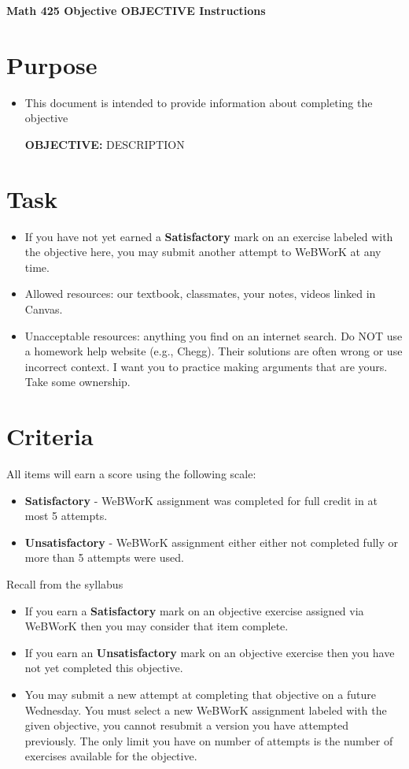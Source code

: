\documentclass[12pt]{article}
\begin{document}
	\begin{center}
		{\Large \bf Math 425 Objective OBJECTIVE Instructions}
	\end{center}
	\section*{Purpose}
	\begin{itemize}
		\item This document is intended to provide information about completing the objective
		
		\textbf{OBJECTIVE:} DESCRIPTION

	\end{itemize}
	\section*{Task}
	\begin{itemize}
		\item If you have not yet earned a \textbf{Satisfactory} mark on an exercise labeled with the objective here, you may submit another attempt to WeBWorK at any time.
		\item Allowed resources: our textbook, classmates, your notes, videos linked in Canvas.
		\item Unacceptable resources: anything you find on an internet search. Do NOT use a homework help website (e.g., Chegg). Their solutions are often wrong or use incorrect context.  I want you to practice making arguments that are yours. Take some ownership.
	\end{itemize}
	\section*{Criteria}
	All items will earn a score using the following scale:
	\begin{itemize}
		\item \textbf{Satisfactory} - WeBWorK assignment was completed for full credit in at most 5 attempts.
		\item \textbf{Unsatisfactory} - WeBWorK assignment either either not completed fully or more than 5 attempts were used.
	\end{itemize}
	Recall from the syllabus
	\begin{itemize}
		\item If you earn a \textbf{Satisfactory} mark on an objective exercise assigned via WeBWorK  then you may consider that item complete. 
		\item If you earn an \textbf{Unsatisfactory} mark on an objective exercise then you have not yet completed this objective.
		\item You may submit a new attempt at completing that objective on a future Wednesday. You must select a new WeBWorK assignment labeled with the given objective, you cannot resubmit a version you have attempted previously.  The only limit you have on number of attempts is the number of exercises available for the objective.
	\end{itemize}
	
\end{document}
